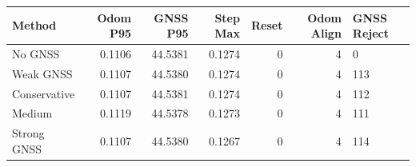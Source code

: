 \begin{tabular}{lrrrrr}
\hline
Method & Odom P95 & GNSS P95 & Step Max & Reset & Odom Align & GNSS Reject \\
\hline
No GNSS & 0.1106 & 44.5381 & 0.1274 & 0 & 4 & 0 \\
Weak GNSS & 0.1107 & 44.5380 & 0.1274 & 0 & 4 & 113 \\
Conservative & 0.1107 & 44.5381 & 0.1274 & 0 & 4 & 112 \\
Medium & 0.1119 & 44.5378 & 0.1273 & 0 & 4 & 111 \\
Strong GNSS & 0.1107 & 44.5380 & 0.1267 & 0 & 4 & 114 \\
\hline
\end{tabular}
